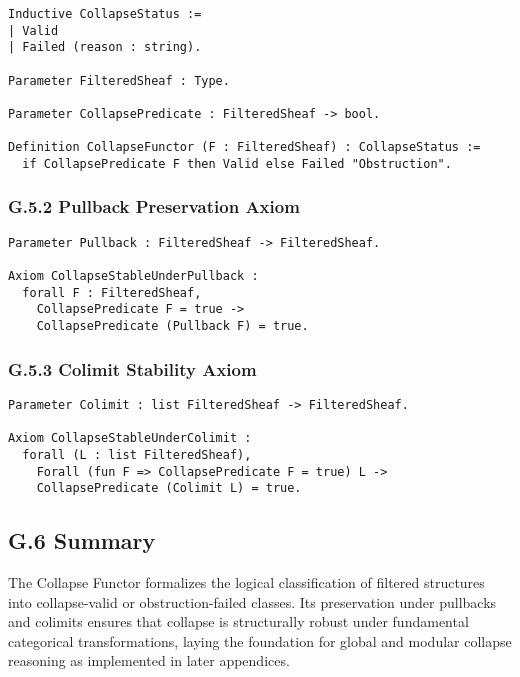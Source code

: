 \documentclass[11pt]{article}
\begin{document}
\begin{lstlisting}[language=Coq, caption=Collapse Functor Output Type, captionpos=b]
Inductive CollapseStatus :=
| Valid
| Failed (reason : string).

Parameter FilteredSheaf : Type.

Parameter CollapsePredicate : FilteredSheaf -> bool.

Definition CollapseFunctor (F : FilteredSheaf) : CollapseStatus :=
  if CollapsePredicate F then Valid else Failed "Obstruction".
\end{lstlisting}

\subsubsection*{G.5.2 Pullback Preservation Axiom}

\begin{lstlisting}[language=Coq, caption=Collapse Pullback Preservation, captionpos=b]
Parameter Pullback : FilteredSheaf -> FilteredSheaf.

Axiom CollapseStableUnderPullback :
  forall F : FilteredSheaf,
    CollapsePredicate F = true ->
    CollapsePredicate (Pullback F) = true.
\end{lstlisting}

\subsubsection*{G.5.3 Colimit Stability Axiom}

\begin{lstlisting}[language=Coq, caption=Collapse Colimit Preservation, captionpos=b]
Parameter Colimit : list FilteredSheaf -> FilteredSheaf.

Axiom CollapseStableUnderColimit :
  forall (L : list FilteredSheaf),
    Forall (fun F => CollapsePredicate F = true) L ->
    CollapsePredicate (Colimit L) = true.
\end{lstlisting}

\subsection*{G.6 Summary}

The Collapse Functor formalizes the logical classification of filtered structures into collapse-valid or obstruction-failed classes. Its preservation under pullbacks and colimits ensures that collapse is structurally robust under fundamental categorical transformations, laying the foundation for global and modular collapse reasoning as implemented in later appendices.
\end{document}
